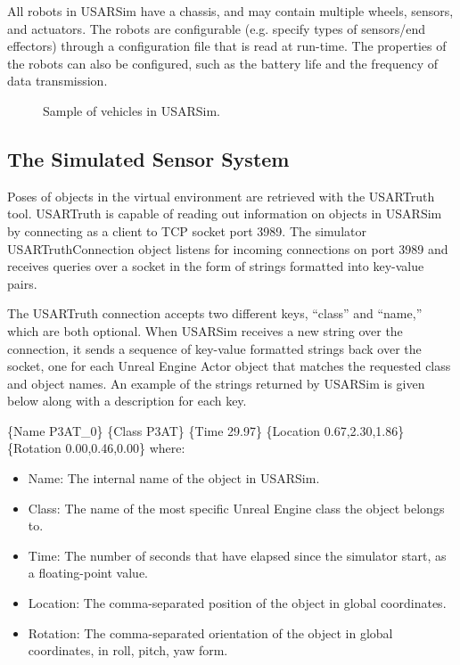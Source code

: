All robots in USARSim have a chassis, and may contain multiple wheels, sensors, and
actuators. The robots are configurable (e.g. specify types of
sensors/end effectors) through a configuration file that is read at run-time. The properties of the robots can
also be configured, such as the battery life and the frequency of
data transmission.

\begin{figure}[t!]
\centering
{}\qquad
{}\qquad
{}\qquad
{}
\caption{Sample of vehicles in USARSim.}
\end{figure}

\subsection{The Simulated Sensor System}
\label{subsection:usartruth}
Poses of objects in the virtual environment are retrieved with the USARTruth tool. USARTruth is capable of reading out information on objects in USARSim by connecting as a client to TCP socket port 3989. The simulator USARTruthConnection object listens for incoming connections on port 3989 and receives queries over a socket in the form of strings formatted into key-value pairs. 

The USARTruth connection accepts two different keys, ``class'' and ``name,'' which are both optional. When USARSim receives a new string over the connection, it sends a sequence of key-value formatted strings back over the socket, one for each Unreal Engine Actor object that matches the requested class and object names. An example of the strings returned by USARSim is given below along with a description for each key.


\{Name P3AT\_0\} \{Class P3AT\} \{Time 29.97\} \{Location 0.67,2.30,1.86\} \\ \{Rotation 0.00,0.46,0.00\} where:

\begin{itemize}
\item Name: The internal name of the object in USARSim.
\item Class: The name of the most specific Unreal Engine class the object belongs to.
\item Time: The number of seconds that have elapsed since the simulator start, as a floating-point value.
\item Location: The comma-separated position of the object in global coordinates.
\item Rotation: The comma-separated orientation of the object in global coordinates, in roll, pitch, yaw form.
\end{itemize}


